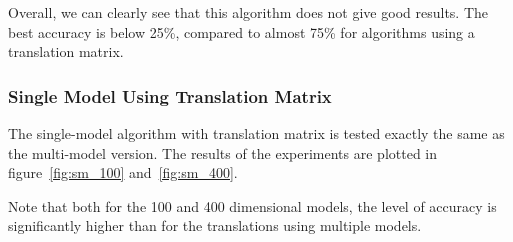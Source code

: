 Overall, we can clearly see that this algorithm does not give good results. The best accuracy is below 25\%, compared to almost 75\% for algorithms using a translation matrix.

\subsubsection{Single Model Using Translation Matrix}
The single-model algorithm with translation matrix is tested exactly the same as the multi-model version. The results of the experiments are plotted in figure~\ref{fig:sm_100} and~\ref{fig:sm_400}.

Note that both for the 100 and 400 dimensional models, the level of accuracy is significantly higher than for the translations using multiple models.

